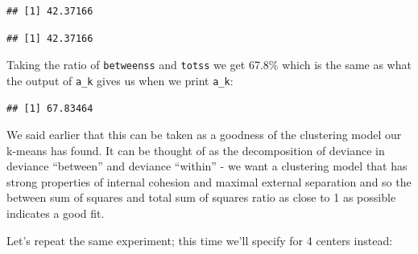 \documentclass[]{article}
\newenvironment{Shaded}{\begin{snugshade}}{\end{snugshade}}
\newcommand{\DataTypeTok}[1]{\textcolor[rgb]{0.13,0.29,0.53}{#1}}
\newcommand{\DecValTok}[1]{\textcolor[rgb]{0.00,0.00,0.81}{#1}}
\newcommand{\FloatTok}[1]{\textcolor[rgb]{0.00,0.00,0.81}{#1}}
\newcommand{\KeywordTok}[1]{\textcolor[rgb]{0.13,0.29,0.53}{\textbf{#1}}}
\newcommand{\NormalTok}[1]{#1}
\newcommand{\OperatorTok}[1]{\textcolor[rgb]{0.81,0.36,0.00}{\textbf{#1}}}
\newcommand{\StringTok}[1]{\textcolor[rgb]{0.31,0.60,0.02}{#1}}
\begin{document}
\begin{verbatim}
## [1] 42.37166
\end{verbatim}

\begin{Shaded}
\end{Shaded}

\begin{verbatim}
## [1] 42.37166
\end{verbatim}

Taking the ratio of \texttt{betweenss} and \texttt{totss} we get 67.8\%
which is the same as what the output of \texttt{a\_k} gives us when we
print \texttt{a\_k}:

\begin{Shaded}
\end{Shaded}

\begin{verbatim}
## [1] 67.83464
\end{verbatim}

We said earlier that this can be taken as a goodness of the clustering
model our k-means has found. It can be thought of as the decomposition
of deviance in deviance ``between'' and deviance ``within'' - we want a
clustering model that has strong properties of internal cohesion and
maximal external separation and so the between sum of squares and total
sum of squares ratio as close to 1 as possible indicates a good fit.

Let's repeat the same experiment; this time we'll specify for 4 centers
instead:

\begin{Shaded}
\end{Shaded}
\end{document}
